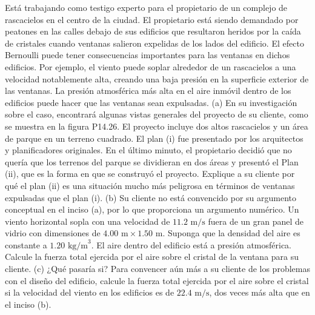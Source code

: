 \item Está trabajando como testigo experto para el propietario de un complejo de rascacielos en el centro de la ciudad. El propietario está siendo demandado por peatones en las calles debajo de sus edificios que resultaron heridos por la caída de cristales cuando ventanas salieron expelidas de los lados del edificio. El efecto Bernoulli puede tener consecuencias importantes para las ventanas en dichos edificios. Por ejemplo, el viento puede soplar alrededor de un rascacielos a una velocidad notablemente alta, creando una baja presión en la superficie exterior de las ventanas. La presión atmosférica más alta en el aire inmóvil dentro de los edificios puede hacer que las ventanas sean expulsadas. (a) En su investigación sobre el caso, encontrará algunas vistas generales del proyecto de su cliente, como se muestra en la figura P14.26. El proyecto incluye dos altos rascacielos y un área de parque en un terreno cuadrado. El plan (i) fue presentado por los arquitectos y planificadores originales. En el último minuto, el propietario decidió que no quería que los terrenos del parque se dividieran en dos áreas y presentó el Plan (ii), que es la forma en que se construyó el proyecto. Explique a su cliente por qué el plan (ii) es una situación mucho más peligrosa en términos de ventanas expulsadas que el plan (i). (b) Su cliente no está convencido por su argumento conceptual en el inciso (a), por lo que proporciona un argumento numérico. Un viento horizontal sopla con una velocidad de $11.2 \text{ m/s}$ fuera de un gran panel de vidrio con dimensiones de $4.00 \text{ m} \times 1.50 \text{ m}$. Suponga que la densidad del aire es constante a $1.20 \text{ kg/m}^3$. El aire dentro del edificio está a presión atmosférica. Calcule la fuerza total ejercida por el aire sobre el cristal de la ventana para su cliente. (c) ¿Qué pasaría si? Para convencer aún más a su cliente de los problemas con el diseño del edificio, calcule la fuerza total ejercida por el aire sobre el cristal si la velocidad del viento en los edificios es de $22.4 \text{ m/s}$, dos veces más alta que en el inciso (b).
